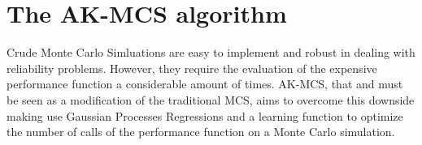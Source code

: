\chapter{The AK-MCS algorithm}
\label{ch:5}

Crude Monte Carlo Simluations are easy to implement and robust in dealing with 
reliability problems. However, they require the evaluation of the expensive performance
function a considerable amount of times. AK-MCS, that  and must be seen as a modification of the traditional MCS,
aims to overcome this downside making use Gaussian Processes
Regressions and a learning function to optimize the number of calls of the performance function
on a Monte Carlo simulation.

